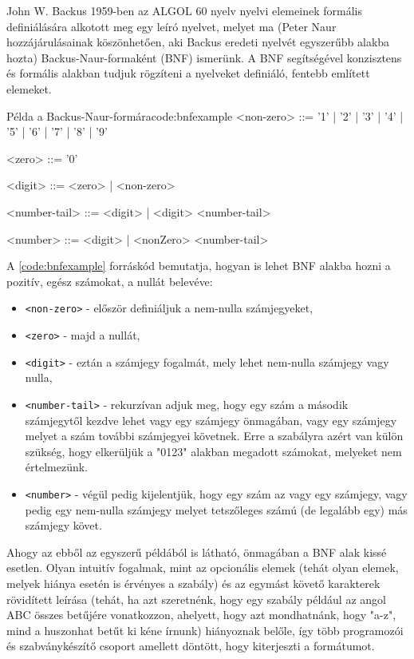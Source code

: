 John W. Backus 1959-ben az ALGOL 60 nyelv nyelvi elemeinek formális definiálására alkotott meg egy leíró nyelvet\cite{bnf}, melyet ma (Peter Naur hozzájárulásainak köszönhetően, aki Backus eredeti nyelvét egyszerűbb alakba hozta) Backus-Naur-formaként (BNF) ismerünk. A BNF segítségével konzisztens és formális alakban tudjuk rögzíteni a nyelveket definiáló, fentebb említett elemeket.

\begin{code}{Példa a Backus-Naur-formára}{code:bnfexample}
<non-zero> ::= '1' | '2' | '3' 
            | '4' | '5' | '6' 
            | '7' | '8' | '9'

<zero> ::= '0'

<digit> ::= <zero> | <non-zero>

<number-tail> ::= <digit> | <digit> <number-tail>

<number> ::= <digit> | <nonZero> <number-tail> 
\end{code}

A \ref{code:bnfexample} forráskód bemutatja, hogyan is lehet BNF alakba hozni a pozitív, egész számokat, a nullát belevéve: 

\begin{itemize}
  \item \texttt{<non-zero>} - először definiáljuk a nem-nulla számjegyeket,
  \item \texttt{<zero>} - majd a nullát, 
  \item \texttt{<digit>} - eztán a számjegy fogalmát, mely lehet nem-nulla számjegy vagy nulla,
  \item \texttt{<number-tail>} - rekurzívan adjuk meg, hogy egy szám a második számjegytől kezdve lehet vagy egy számjegy önmagában, vagy egy számjegy melyet a szám további számjegyei követnek. Erre a szabályra azért van külön szükség, hogy elkerüljük a "0123" alakban megadott számokat, melyeket nem értelmezünk.
  \item \texttt{<number>} - végül pedig kijelentjük, hogy egy szám az vagy egy számjegy, vagy pedig egy nem-nulla számjegy melyet tetszőleges számú (de legalább egy) más számjegy követ.
\end{itemize}

Ahogy az ebből az egyszerű példából is látható, önmagában a BNF alak kissé esetlen. Olyan intuitív fogalmak, mint az opcionális elemek (tehát olyan elemek, melyek hiánya esetén is érvényes a szabály) és az egymást követő karakterek rövidített leírása (tehát, ha azt szeretnénk, hogy egy szabály például az angol ABC összes betűjére vonatkozzon, ahelyett, hogy azt mondhatnánk, hogy "a-z", mind a huszonhat betűt ki kéne írnunk) hiányoznak belőle, így több programozói és szabványkészítő csoport amellett döntött, hogy kiterjeszti a formátumot.

